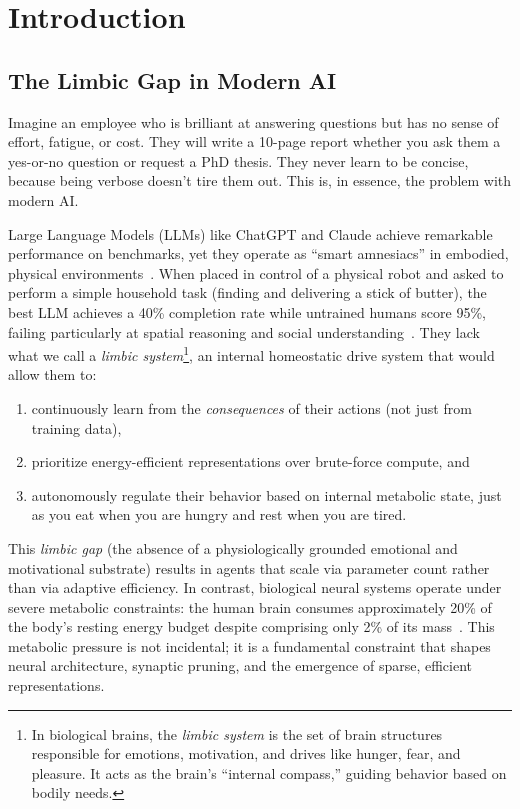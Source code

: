 \documentclass[12pt, a4paper]{article}
\begin{document}
\section{Introduction}
\label{sec:intro}

\subsection{The Limbic Gap in Modern AI}

Imagine an employee who is brilliant at answering questions but has no sense of effort, fatigue, or cost. They will write a 10-page report whether you ask them a yes-or-no question or request a PhD thesis. They never learn to be concise, because being verbose doesn't tire them out. This is, in essence, the problem with modern AI.

Large Language Models (LLMs) like ChatGPT and Claude achieve remarkable performance on benchmarks, yet they operate as ``smart amnesiacs'' in embodied, physical environments~\cite{grand1997creatures, grand1998creatures}. When placed in control of a physical robot and asked to perform a simple household task (finding and delivering a stick of butter), the best LLM achieves a 40\% completion rate while untrained humans score 95\%, failing particularly at spatial reasoning and social understanding~\cite{sharrock2025butterbench}. They lack what we call a \emph{limbic system}\footnote{In biological brains, the \emph{limbic system} is the set of brain structures responsible for emotions, motivation, and drives like hunger, fear, and pleasure. It acts as the brain's ``internal compass,'' guiding behavior based on bodily needs.}, an internal homeostatic drive system that would allow them to:
\begin{enumerate}[label=(\alph*), nosep]
  \item continuously learn from the \emph{consequences} of their actions (not just from training data),
  \item prioritize energy-efficient representations over brute-force compute, and
  \item autonomously regulate their behavior based on internal metabolic state, just as you eat when you are hungry and rest when you are tired.
\end{enumerate}

This \emph{limbic gap} (the absence of a physiologically grounded emotional and motivational substrate) results in agents that scale via parameter count rather than via adaptive efficiency. In contrast, biological neural systems operate under severe metabolic constraints: the human brain consumes approximately 20\% of the body's resting energy budget despite comprising only 2\% of its mass~\cite{attwell2001energy}. This metabolic pressure is not incidental; it is a fundamental constraint that shapes neural architecture, synaptic pruning, and the emergence of sparse, efficient representations.
\end{document}
